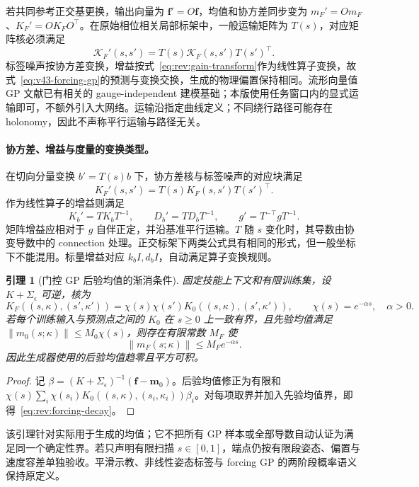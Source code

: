 \documentclass[11pt,a4paper]{article}
\numberwithin{equation}{section}
\newtheorem{lemma}[theorem]{引理}
\theoremstyle{definition}
\begin{document}
若共同参考正交基更换，输出向量为 $\mathbf f'=O\mathbf f$，均值和协方差同步变为 $m_F'=Om_F$、$K_F'=OK_FO^\top$。在原始相位相关局部标架中，一般运输矩阵为 $T(s)$，对应矩阵核必须满足
\begin{equation}
 \mathcal K_F'(s,s')=T(s)\mathcal K_F(s,s')T(s')^\top.
 \label{eq:v43-gauge-kernel}
\end{equation}
标签噪声按协方差变换，增益按式~\eqref{eq:rev:gain-transform}作为线性算子变换，故式~\eqref{eq:v43-forcing-gp}的预测与变换交换，生成的物理偏置保持相同。流形向量值 GP 文献已有相关的 gauge-independent 建模基础\cite{gpmanifold2021}；本版使用任务窗口内的显式运输即可，不额外引入大网络。运输沿指定曲线定义；不同绕行路径可能存在 holonomy，因此不声称平行运输与路径无关。

\paragraph{协方差、增益与度量的变换类型。}
在切向分量变换 $b'=T(s)b$ 下，协方差核与标签噪声的对应块满足
\begin{equation}
 K_F'(s,s')=T(s)K_F(s,s')T(s')^\top.
 \label{eq:rev:covariance-transform}
\end{equation}
作为线性算子的增益则满足
\begin{equation}
 K_b'=TK_bT^{-1},\qquad D_b'=TD_bT^{-1},\qquad
 g'=T^{-\top}gT^{-1}.
 \label{eq:rev:gain-transform}
\end{equation}
矩阵增益应相对于 $g$ 自伴正定，并沿基准平行运输。$T$ 随 $s$ 变化时，其导数由协变导数中的 connection 处理。正交标架下两类公式具有相同的形式，但一般坐标下不能混用。标量增益对应 $k_bI,d_bI$，自动满足算子变换规则。

\begin{lemma}[门控 GP 后验均值的渐消条件]
\label{lem:rev:gated-mean}
固定技能上下文和有限训练集，设 $K+\Sigma_\epsilon$ 可逆，核为
\begin{equation}
 K_F((s,\kappa),(s',\kappa'))
 =\chi(s)\chi(s')K_0((s,\kappa),(s',\kappa')),
 \qquad\chi(s)=e^{-\alpha s},\quad\alpha>0.
\end{equation}
若每个训练输入与预测点之间的 $K_0$ 在 $s\ge0$ 上一致有界，且先验均值满足 $\|m_0(s;\kappa)\|\le M_0\chi(s)$，则存在有限常数 $M_F$ 使
\begin{equation}
 \|m_F(s;\kappa)\|\le M_Fe^{-\alpha s}.
 \label{eq:rev:forcing-decay}
\end{equation}
因此生成器使用的后验均值趋零且平方可积。
\end{lemma}
\begin{proof}
记 $\beta=(K+\Sigma_\epsilon)^{-1}(\mathbf f-\mathbf m_0)$。后验均值修正为有限和 $\chi(s)\sum_i\chi(s_i)K_0((s,\kappa),(s_i,\kappa_i))\beta_i$。对每项取界并加入先验均值界，即得~\eqref{eq:rev:forcing-decay}。
\end{proof}
该引理针对实际用于生成的均值；它不把所有 GP 样本或全部导数自动认证为满足同一个确定性界。若只声明有限扫描 $s\in[0,1]$，端点仍按有限段姿态、偏置与速度容差单独验收。平滑示教、非线性姿态标签与 forcing GP 的两阶段概率语义保持原定义。
\end{document}
